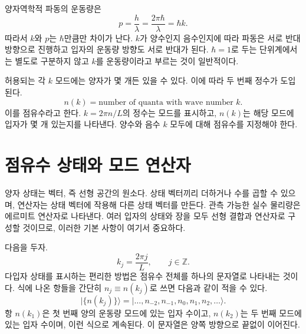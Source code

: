 양자역학적 파동의 운동량은
\begin{equation}
p=\frac{h}{\lambda}
=\frac{2\pi\hbar}{\lambda}
=\hbar k.
\end{equation}
따라서 \(k\)와 \(p\)는 \(\hbar\)만큼만 차이가 난다. \(k\)가 양수인지 음수인지에 따라 파동은 서로 반대 방향으로 진행하고 입자의 운동량 방향도 서로 반대가 된다. \(\hbar=1\)로 두는 단위계에서는 별도로 구분하지 않고 \(k\)를 운동량이라고 부르는 것이 일반적이다.

허용되는 각 \(k\) 모드에는 양자가 몇 개든 있을 수 있다. 이에 따라 두 번째 정수가 도입된다.
\begin{equation}
n(k)=\text{number of quanta with wave number }k.
\end{equation}
이를 점유수라고 한다. \(k=2\pi n/L\)의 정수는 모드를 표시하고, \(n(k)\)는 해당 모드에 입자가 몇 개 있는지를 나타낸다. 양수와 음수 \(k\) 모두에 대해 점유수를 지정해야 한다.

\begin{classroomqa}
\end{classroomqa}

\section{점유수 상태와 모드 연산자}

양자 상태는 벡터, 즉 선형 공간의 원소다. 상태 벡터끼리 더하거나 수를 곱할 수 있으며, 연산자는 상태 벡터에 작용해 다른 상태 벡터를 만든다. 관측 가능한 실수 물리량은 에르미트 연산자로 나타낸다. 여러 입자의 상태와 장을 모두 선형 결합과 연산자로 구성할 것이므로, 이러한 기본 사항이 여기서 중요하다.

다음을 두자.
\begin{equation}
k_j=\frac{2\pi j}{L},
\qquad j\in\mathbb Z.
\end{equation}
다입자 상태를 표시하는 편리한 방법은 점유수 전체를 하나의 문자열로 나타내는 것이다. 식에 나온 항들을 간단히 \(n_j\equiv n(k_j)\)로 쓰면 다음과 같이 적을 수 있다.
\begin{equation}
\big|\{n(k_j)\}\big\rangle
=
\big|\ldots,n_{-2},n_{-1},n_0,n_1,n_2,\ldots\big\rangle.
\end{equation}
항 \(n(k_1)\)은 첫 번째 양의 운동량 모드에 있는 입자 수이고, \(n(k_2)\)는 두 번째 모드에 있는 입자 수이며, 이런 식으로 계속된다. 이 문자열은 양쪽 방향으로 끝없이 이어진다.

